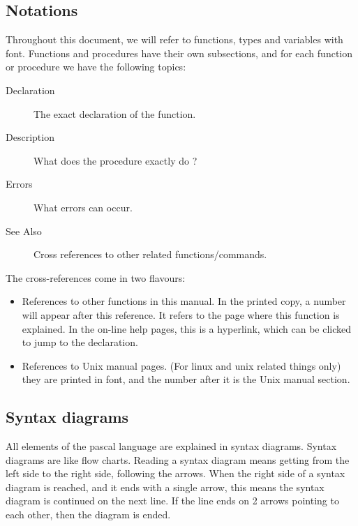 \subsection*{Notations}
Throughout this document, we will refer to functions, types and variables
with  font. Functions and procedures have their own
subsections, and for each function or procedure we have the following
topics:
\begin{description}
\item [Declaration] The exact declaration of the function.
\item [Description] What does the procedure exactly do ?
\item [Errors] What errors can occur.
\item [See Also] Cross references to other related functions/commands.
\end{description}
The cross-references come in two flavours:
\begin{itemize}
\item References to other functions in this manual. In the printed copy, a
number will appear after this reference. It refers to the page where this
function is explained. In the on-line help pages, this is a hyperlink,
which can be clicked to jump to the declaration.
\item References to Unix manual pages. (For linux and unix related things only) they
are printed in  font, and the number after it is the Unix
manual section.
\end{itemize}
\subsection*{Syntax diagrams}
All elements of the pascal language are explained in syntax diagrams.
Syntax diagrams are like flow charts. Reading a syntax diagram means getting
from the left side to the right side, following the arrows.
When the right side of a syntax diagram is reached, and it ends with a single
arrow, this means the syntax diagram is continued on the next line. If
the line ends on 2 arrows pointing to each other, then the diagram is
ended.

